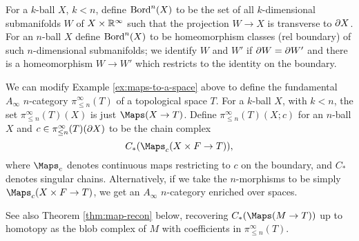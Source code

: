 \begin{example}
\label{ex:bord-cat}
\rm
\label{ex:bordism-category}
For a $k$-ball $X$, $k<n$, define $\operatorname{Bord}^n(X)$ to be the set of all $k$-dimensional
submanifolds $W$ of $X\times \mathbb R^\infty$ such that the projection $W \to X$ is transverse
to $\partial X$.
For an $n$-ball $X$ define $\operatorname{Bord}^n(X)$ to be homeomorphism classes (rel boundary) of such $n$-dimensional submanifolds;
we identify $W$ and $W'$ if $\partial W = \partial W'$ and there is a homeomorphism
$W \to W'$ which restricts to the identity on the boundary.
\end{example}





\begin{example}
\rm
\label{ex:chains-of-maps-to-a-space}
We can modify Example \ref{ex:maps-to-a-space} above to define the fundamental $A_\infty$ $n$-category $\pi^\infty_{\le n}(T)$ of a topological space $T$.
For a $k$-ball $X$, with $k < n$, the set $\pi^\infty_{\leq n}(T)(X)$ is just $\Maps(X \to T)$.
Define $\pi^\infty_{\leq n}(T)(X; c)$ for an $n$-ball $X$ and $c \in \pi^\infty_{\leq n}(T)(\partial X)$ to be the chain complex
\[
	C_*(\Maps_c(X\times F \to T)),
\]
where $\Maps_c$ denotes continuous maps restricting to $c$ on the boundary,
and $C_*$ denotes singular chains.
Alternatively, if we take the $n$-morphisms to be simply $\Maps_c(X\times F \to T)$, 
we get an $A_\infty$ $n$-category enriched over spaces.
\end{example}

See also Theorem \ref{thm:map-recon} below, recovering $C_*(\Maps(M \to T))$ up to 
homotopy as the blob complex of $M$ with coefficients in $\pi^\infty_{\le n}(T)$.


